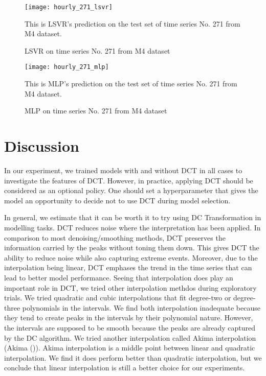 \begin{figure}[H]
    \centering
    \texttt{[image: hourly\_271\_lsvr]}
    \caption{LSVR on time series No. 271 from M4 dataset}
    {\raggedright \footnotesize This is LSVR's prediction on the test set of time series No. 271 from M4 dataset.  \par}
    \label{fig: hourly 271 lsvr}
\end{figure}
\begin{figure}[H]
    \centering
    \texttt{[image: hourly\_271\_mlp]}
    \caption{MLP on time series No. 271 from M4 dataset}
    {\raggedright \footnotesize This is MLP's prediction on the test set of time series No. 271 from M4 dataset.  \par}
    \label{fig: hourly 271 mlp}
\end{figure}

\section{Discussion}
In our experiment, we trained models with and without DCT in all cases to investigate the features of DCT. However, in practice, applying DCT should be considered as an optional policy. One should set a hyperparameter that gives the model an opportunity to decide not to use DCT during model selection.

In general, we estimate that it can be worth it to try using DC Transformation in modelling tasks. DCT reduces noise where the interpretation has been applied. In comparison to most denoising/smoothing methods, DCT preserves the information carried by the peaks without toning them down. This gives DCT the ability to reduce noise while also capturing extreme events. Moreover, due to the interpolation being linear, DCT emphases the trend in the time series that can lead to better model performance. Seeing that interpolation does play an important role in DCT, we tried other interpolation methdos during exploratory trials. We tried quadratic and cubic interpolations that fit degree-two or degree-three polynomials in the intervals. We find both interpolation inadequate because they tend to create peaks in the intervals by their polynomial nature. However, the intervals are supposed to be smooth because the peaks are already captured by the DC algorithm. We tried another interpolation called Akima interpolation (Akima (\citeyear{akima1970new})). Akima interpolation is a middle point between linear and quadratic interpolation. We find it does perform better than quadratic interpolation, but we conclude that linear interpolation is still a better choice for our experiments.
